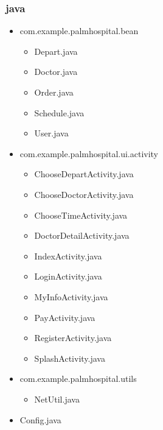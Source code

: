 \documentclass[UTF8,12pt]{article}
\begin{document}
\subsubsection{java}
\begin{itemize}
    \item com.example.palmhospital.bean
    \begin{itemize}
        \item Depart.java
        \item Doctor.java
        \item Order.java
        \item Schedule.java
        \item User.java
    \end{itemize}
    \item com.example.palmhospital.ui.activity
    \begin{itemize}
        \item ChooseDepartActivity.java
        \item ChooseDoctorActivity.java
        \item ChooseTimeActivity.java
        \item DoctorDetailActivity.java
        \item IndexActivity.java
        \item LoginActivity.java
        \item MyInfoActivity.java
        \item PayActivity.java
        \item RegisterActivity.java
        \item SplashActivity.java
    \end{itemize}
    \item com.example.palmhospital.utils
    \begin{itemize}
        \item NetUtil.java
    \end{itemize}
    \item Config.java
\end{itemize}
\end{document}
